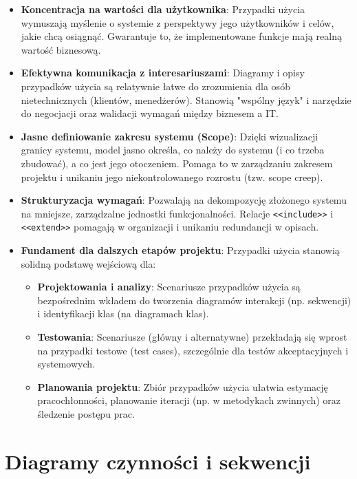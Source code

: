\documentclass[a4paper,12pt]{article}
\begin{document}
\begin{itemize}
    \item \textbf{Koncentracja na wartości dla użytkownika}: Przypadki użycia wymuszają myślenie o systemie z perspektywy jego użytkowników i celów, jakie chcą osiągnąć. Gwarantuje to, że implementowane funkcje mają realną wartość biznesową.
    
    \item \textbf{Efektywna komunikacja z interesariuszami}: Diagramy i opisy przypadków użycia są relatywnie łatwe do zrozumienia dla osób nietechnicznych (klientów, menedżerów). Stanowią "wspólny język" i narzędzie do negocjacji oraz walidacji wymagań między biznesem a IT.
    
    \item \textbf{Jasne definiowanie zakresu systemu (Scope)}: Dzięki wizualizacji granicy systemu, model jasno określa, co należy do systemu (i co trzeba zbudować), a co jest jego otoczeniem. Pomaga to w zarządzaniu zakresem projektu i unikaniu jego niekontrolowanego rozrostu (tzw. scope creep).
    
    \item \textbf{Strukturyzacja wymagań}: Pozwalają na dekompozycję złożonego systemu na mniejsze, zarządzalne jednostki funkcjonalności. Relacje \texttt{<<include>>} i \texttt{<<extend>>} pomagają w organizacji i unikaniu redundancji w opisach.
    
    \item \textbf{Fundament dla dalszych etapów projektu}: Przypadki użycia stanowią solidną podstawę wejściową dla:
    \begin{itemize}
        \item \textbf{Projektowania i analizy}: Scenariusze przypadków użycia są bezpośrednim wkładem do tworzenia diagramów interakcji (np. sekwencji) i identyfikacji klas (na diagramach klas).
        \item \textbf{Testowania}: Scenariusze (główny i alternatywne) przekładają się wprost na przypadki testowe (test cases), szczególnie dla testów akceptacyjnych i systemowych.
        \item \textbf{Planowania projektu}: Zbiór przypadków użycia ułatwia estymację pracochłonności, planowanie iteracji (np. w metodykach zwinnych) oraz śledzenie postępu prac.
    \end{itemize}
\end{itemize}

\section{Diagramy czynności i sekwencji}
\end{document}
